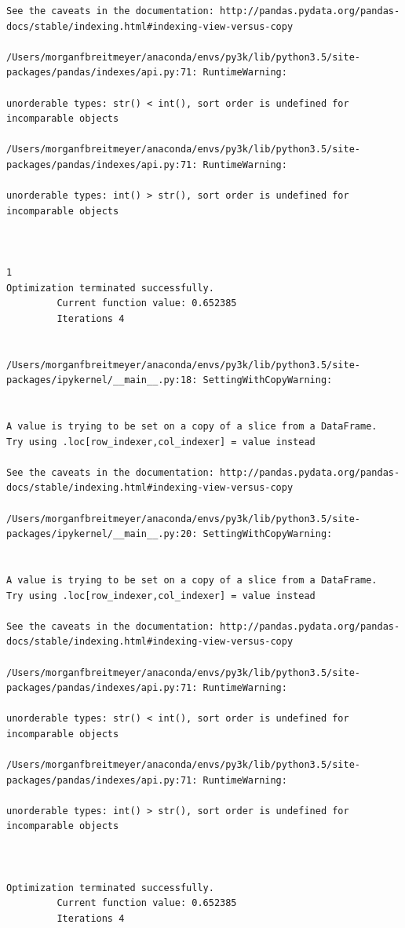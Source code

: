 \begin{lstlisting}
See the caveats in the documentation: http://pandas.pydata.org/pandas-docs/stable/indexing.html#indexing-view-versus-copy

/Users/morganfbreitmeyer/anaconda/envs/py3k/lib/python3.5/site-packages/pandas/indexes/api.py:71: RuntimeWarning:

unorderable types: str() < int(), sort order is undefined for incomparable objects

/Users/morganfbreitmeyer/anaconda/envs/py3k/lib/python3.5/site-packages/pandas/indexes/api.py:71: RuntimeWarning:

unorderable types: int() > str(), sort order is undefined for incomparable objects



1
Optimization terminated successfully.
         Current function value: 0.652385
         Iterations 4


/Users/morganfbreitmeyer/anaconda/envs/py3k/lib/python3.5/site-packages/ipykernel/__main__.py:18: SettingWithCopyWarning:


A value is trying to be set on a copy of a slice from a DataFrame.
Try using .loc[row_indexer,col_indexer] = value instead

See the caveats in the documentation: http://pandas.pydata.org/pandas-docs/stable/indexing.html#indexing-view-versus-copy

/Users/morganfbreitmeyer/anaconda/envs/py3k/lib/python3.5/site-packages/ipykernel/__main__.py:20: SettingWithCopyWarning:


A value is trying to be set on a copy of a slice from a DataFrame.
Try using .loc[row_indexer,col_indexer] = value instead

See the caveats in the documentation: http://pandas.pydata.org/pandas-docs/stable/indexing.html#indexing-view-versus-copy

/Users/morganfbreitmeyer/anaconda/envs/py3k/lib/python3.5/site-packages/pandas/indexes/api.py:71: RuntimeWarning:

unorderable types: str() < int(), sort order is undefined for incomparable objects

/Users/morganfbreitmeyer/anaconda/envs/py3k/lib/python3.5/site-packages/pandas/indexes/api.py:71: RuntimeWarning:

unorderable types: int() > str(), sort order is undefined for incomparable objects



Optimization terminated successfully.
         Current function value: 0.652385
         Iterations 4



\end{lstlisting}
